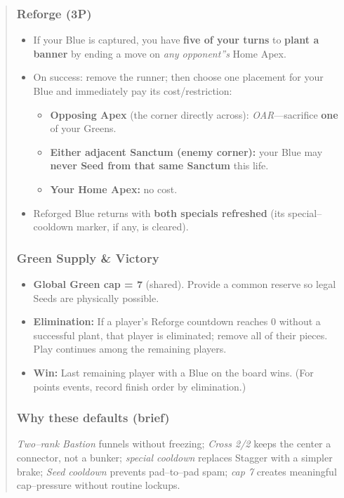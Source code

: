 \documentclass[11pt]{article}
\begin{document}
\begin{quote}
\subsubsection*{Reforge (3P)}
\begin{itemize}[leftmargin=1.3em,itemsep=0.25em]
  \item If your Blue is captured, you have \textbf{five of your turns} to \textbf{plant a banner} by ending a move on \emph{any opponent''s} Home Apex.
  \item On success: remove the runner; then choose one placement for your Blue and immediately pay its cost/restriction:
  \begin{itemize}[leftmargin=1.3em,itemsep=0.1em]
    \item \textbf{Opposing Apex} (the corner directly across): \textit{OAR}---sacrifice \textbf{one} of your Greens.
    \item \textbf{Either adjacent Sanctum (enemy corner):} your Blue may \textbf{never Seed from that same Sanctum} this life.
    \item \textbf{Your Home Apex:} no cost.
  \end{itemize}
  \item Reforged Blue returns with \textbf{both specials refreshed} (its special--cooldown marker, if any, is cleared).
\end{itemize}

\subsubsection*{Green Supply \& Victory}
\begin{itemize}[leftmargin=1.3em,itemsep=0.25em]
  \item \textbf{Global Green cap = 7} (shared). Provide a common reserve so legal Seeds are physically possible.
  \item \textbf{Elimination:} If a player's Reforge countdown reaches 0 without a successful plant, that player is eliminated; remove all of their pieces. Play continues among the remaining players.
  \item \textbf{Win:} Last remaining player with a Blue on the board wins. (For points events, record finish order by elimination.)
\end{itemize}

\subsubsection*{Why these defaults (brief)}
\noindent \emph{Two--rank Bastion} funnels without freezing; \emph{Cross 2/2} keeps the center a connector, not a bunker; \emph{special cooldown} replaces Stagger with a simpler brake; \emph{Seed cooldown} prevents pad--to--pad spam; \emph{cap 7} creates meaningful cap--pressure without routine lockups.


\end{quote}
\end{document}
